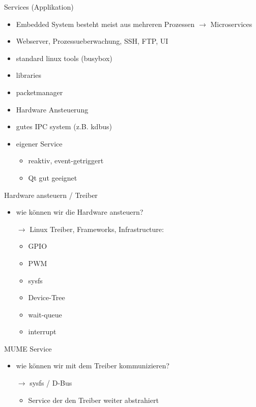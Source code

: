 \begin{frame}{Services (Applikation)}
	\begin{itemize}
		\item Embedded System besteht meist aus mehreren Prozessen $\rightarrow$ Microservices
		\item Webserver, Prozessueberwachung, SSH, FTP, UI
		\item standard linux tools (busybox)
		\item libraries
		\item packetmanager
		\item Hardware Ansteuerung
		\item gutes IPC system (z.B. kdbus)
		\item eigener Service
		\begin{itemize}
			\item reaktiv, event-getriggert
			\item Qt gut geeignet
		\end{itemize}
	\end{itemize}
\end{frame}

\begin{frame}{Hardware ansteuern / Treiber}
	\begin{itemize}
		\item wie können wir die Hardware ansteuern?
		\item[$\rightarrow$] Linux Treiber, Frameworks, Infrastructure:
		\begin{itemize}
			\item GPIO
			\item PWM
			\item sysfs
			\item Device-Tree
			\item wait-queue
			\item interrupt
		\end{itemize}
	\end{itemize}
\end{frame}

\begin{frame}{MUME Service}
	\begin{itemize}
		\item wie können wir mit dem Treiber kommunizieren?
		\item[$\rightarrow$] sysfs / D-Bus
		\begin{itemize}
			\item Service der den Treiber weiter abstrahiert
		\end{itemize}
	\end{itemize}
\end{frame}

